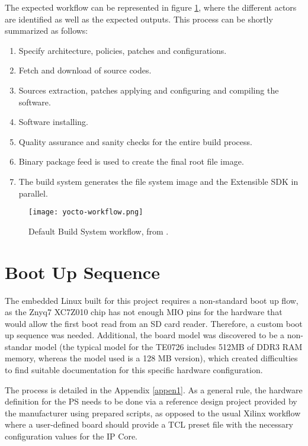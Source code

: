 The expected workflow can be represented in figure \ref{fig:yocto-workflow}, where the different actors are identified as well as the expected outputs. This process can be shortly summarized as follows:

\begin{enumerate}
	\item Specify architecture, policies, patches and configurations.
	\item Fetch and download of source codes.
	\item Sources extraction, patches applying and configuring and compiling the software.
	\item Software installing.
	\item Quality assurance and sanity checks for the entire build process.
	\item Binary package feed is used to create the final root file image.
	\item The build system generates the file system image and the Extensible SDK in parallel.
\end{enumerate}

\begin{figure}[htp]
	\centering
	\texttt{[image: yocto-workflow.png]}
	\caption{Default Build System workflow, from \cite{yocto-manual}.} \label{fig:yocto-workflow}
\end{figure}

\section{Boot Up Sequence}

The embedded Linux built for this project requires a non-standard boot up flow, as the Znyq7 XC7Z010 chip has not enough MIO pins for the hardware that would allow the first boot read from an SD card reader. Therefore, a custom boot up sequence was needed. Additional, the board model was discovered to be a non-standar model (the typical model for the TE0726 includes 512MB of DDR3 RAM memory, whereas the model used is a 128 MB version), which created difficulties to find suitable documentation for this specific hardware configuration.

The process is detailed in the Appendix \ref{appen1}. As a general rule, the hardware definition for the PS needs to be done via a reference design project provided by the manufacturer using prepared scripts, as opposed to the usual Xilinx workflow where a user-defined board should provide a TCL preset file with the necessary configuration values for the IP Core.


